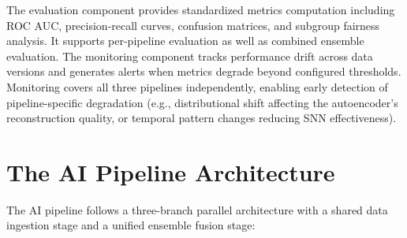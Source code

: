 The evaluation component provides standardized metrics computation including ROC AUC, precision-recall curves, confusion matrices, and subgroup fairness analysis. It supports per-pipeline evaluation as well as combined ensemble evaluation. The monitoring component tracks performance drift across data versions and generates alerts when metrics degrade beyond configured thresholds. Monitoring covers all three pipelines independently, enabling early detection of pipeline-specific degradation (e.g., distributional shift affecting the autoencoder's reconstruction quality, or temporal pattern changes reducing SNN effectiveness).

\section{The AI Pipeline Architecture}

The AI pipeline follows a three-branch parallel architecture with a shared data ingestion stage and a unified ensemble fusion stage:

